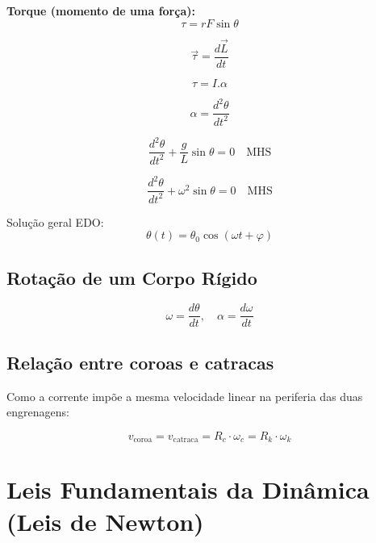 \documentclass[a4paper,12pt]{article}
\begin{document}
\begin{multicols}{2}
\textbf{Torque (momento de uma força):}
\begin{equation*}
  \tau = r F \sin \theta
\end{equation*}

\begin{equation*}
  \vec{\tau} = \frac{d\vec{L}}{dt}
\end{equation*}

\begin{equation*}
  \tau = I.\alpha
\end{equation*}

\begin{equation*}
  \alpha = \frac{d^{2}\theta}{dt^{2}}
\end{equation*}

\begin{equation*}
  \frac{d^{2}\theta}{dt^{2}} + \frac{g}{L}\sin\theta = 0 \quad \textrm{MHS}
\end{equation*}

\begin{equation*}
  \frac{d^{2}\theta}{dt^{2}} + \omega^{2}\sin\theta = 0 \quad \textrm{MHS}
\end{equation*}

Solução geral EDO:
\begin{equation*}
  \theta(t) = \theta_{0} \cos(\omega t + \varphi)
\end{equation*}

\subsection{Rota\c{c}\~ao de um Corpo R\'igido}
\begin{equation*}
  \omega = \frac{d\theta}{dt}, \quad \alpha = \frac{d\omega}{dt}
\end{equation*}

\subsection{Relação entre coroas e catracas}

Como a corrente impõe a mesma velocidade linear na periferia das duas engrenagens:

\begin{equation*}
  v_{\text{coroa}} = v_{\text{catraca}} = R_c \cdot \omega_c = R_k \cdot \omega_k
\end{equation*}

\section{Leis Fundamentais da Dinâmica (Leis de Newton)}


\end{multicols}
\end{document}
